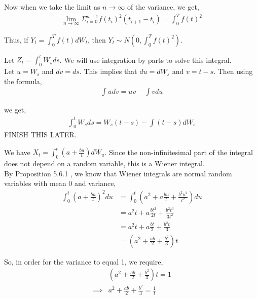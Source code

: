 \documentclass[12pt]{article}
\newenvironment{problem}[2][Problem]{\begin{trivlist}
\item[\hskip \labelsep {\bfseries #1}\hskip \labelsep {\bfseries #2.}]}{\end{trivlist}}
\begin{document}
Now when we take the limit as $n \to \infty$ of the variance, we get,
\begin{align*}
\lim_{n \to \infty} \Sigma_{i=0}^{n-1} f(t_i)^2(t_{i+1} - t_i) = \int_0^T f(t)^2
\end{align*}

Thus, if $Y_t = \int_0^T f(t) dW_t$, then $Y_t \sim N(0, \int_0^T f(t)^2)$.

\begin{problem}{15}
\end{problem}

Let $Z_t = \int_0^t W_s ds$. We will use integration by parts to solve this integral.\\

Let $u = W_s$ and $dv = ds$. This implies that $du = dW_s$ and $v = t-s$. Then using the formula,
\begin{align*}
\int udv = uv - \int v du
\end{align*}

we get,
\begin{align*}
\int_0^t W_s ds = W_s(t-s) - \int (t-s) dW_s
\end{align*}
FINISH THIS LATER.

\begin{problem}{16}
\end{problem}

We have $X_t = \int_0^t (a+\frac{bu}{t}) dW_u$. Since the non-infinitesimal part of the integral does not depend on a random variable, this is a Wiener integral.\\

By Proposition 5.6.1 , we know that Wiener integrals are normal random variables with mean 0 and variance,
\begin{align*}
\int_0^t (a+\frac{bu}{t})^2du &= \int_0^t (a^2 + a\frac{bu}{t} + \frac{b^2u^2}{t^2}) du\\
&= a^2t + a\frac{bt^2}{2t} + \frac{b^2t^3}{3t^2}\\
&= a^2t + a\frac{bt}{2} + \frac{b^2t}{3}\\
&= (a^2 + \frac{ab}{2} + \frac{b^2}{3})t
\end{align*}

So, in order for the variance to equal 1, we require,
\begin{align*}
&(a^2 + \frac{ab}{2} + \frac{b^2}{3})t = 1\\
\implies &a^2 + \frac{ab}{2} + \frac{b^2}{3} = \frac{1}{t}
\end{align*}

\begin{problem}{17}
\end{problem}
\end{document}
